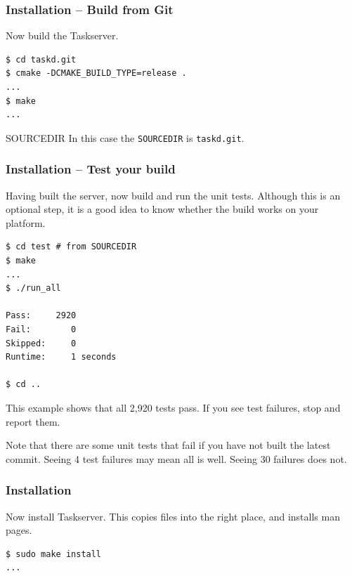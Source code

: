 \documentclass[t,handout]{beamer}
\begin{document}
\begin{frame}[fragile]\frametitle{Installation -- Build from Git}\label{buildgit}
    \vfill
    Now build the Taskserver.

    \begin{lstlisting}
$ cd taskd.git
$ cmake -DCMAKE_BUILD_TYPE=release .
...
$ make
...\end{lstlisting}

    \begin{alertblock}{SOURCEDIR}
        In this case the \verb=SOURCEDIR= is \verb=taskd.git=.
    \end{alertblock}
\end{frame}

\begin{frame}[fragile]\frametitle{Installation -- Test your build}\label{buildtest}
    \vfill
    Having built the server, now build and run the unit tests. Although this is an optional step, it is a good idea to know whether the build works on your platform.

    \begin{lstlisting}
$ cd test # from SOURCEDIR
$ make
...
$ ./run_all

Pass:     2920
Fail:        0
Skipped:     0
Runtime:     1 seconds

$ cd ..\end{lstlisting}

    This example shows that all 2,920 tests pass.  If you see test failures, stop and report them.

    Note that there are some unit tests that fail if you have not built the latest commit. Seeing 4 test failures may mean all is well. Seeing 30 failures does not.
\end{frame}

\begin{frame}[fragile]\frametitle{Installation}
    \vfill
    Now install Taskserver. This copies files into the right place, and installs man pages.

    \begin{lstlisting}
$ sudo make install
...\end{lstlisting}
\end{frame}
\end{document}
